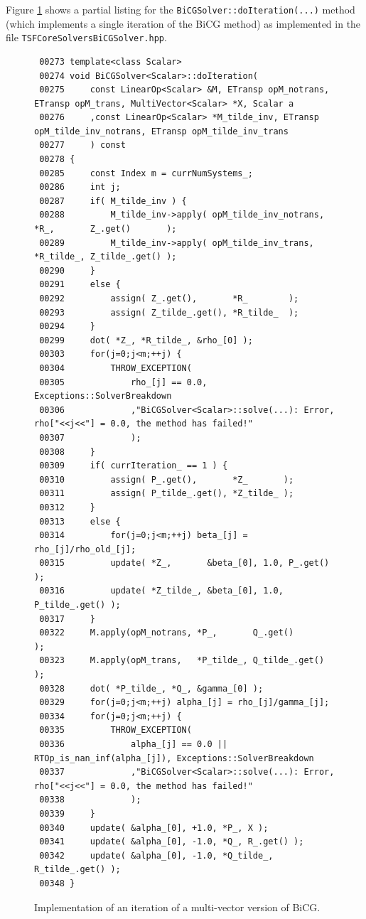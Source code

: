 Figure \ref{tsfcore:fig:BiCG_code} shows a partial listing for the
\texttt{BiCGSolver\-::doIteration(...)} method (which implements
a single iteration of the BiCG method) as implemented in the file
\texttt{TSFCore\-Solvers\-BiCG\-Solver.hpp}.
%
{\bsinglespace
\begin{figure}
\begin{minipage}{\textwidth}
{\scriptsize\begin{verbatim}
 00273 template<class Scalar>
 00274 void BiCGSolver<Scalar>::doIteration(
 00275     const LinearOp<Scalar> &M, ETransp opM_notrans, ETransp opM_trans, MultiVector<Scalar> *X, Scalar a
 00276     ,const LinearOp<Scalar> *M_tilde_inv, ETransp opM_tilde_inv_notrans, ETransp opM_tilde_inv_trans
 00277     ) const
 00278 {
 00285     const Index m = currNumSystems_;
 00286     int j;
 00287     if( M_tilde_inv ) {
 00288         M_tilde_inv->apply( opM_tilde_inv_notrans, *R_,       Z_.get()       );
 00289         M_tilde_inv->apply( opM_tilde_inv_trans,   *R_tilde_, Z_tilde_.get() );
 00290     }
 00291     else {
 00292         assign( Z_.get(),       *R_        );
 00293         assign( Z_tilde_.get(), *R_tilde_  );
 00294     }
 00299     dot( *Z_, *R_tilde_, &rho_[0] );
 00303     for(j=0;j<m;++j) {
 00304         THROW_EXCEPTION(
 00305             rho_[j] == 0.0, Exceptions::SolverBreakdown
 00306             ,"BiCGSolver<Scalar>::solve(...): Error, rho["<<j<<"] = 0.0, the method has failed!"
 00307             );
 00308     }
 00309     if( currIteration_ == 1 ) {
 00310         assign( P_.get(),       *Z_       );
 00311         assign( P_tilde_.get(), *Z_tilde_ );
 00312     }
 00313     else {
 00314         for(j=0;j<m;++j) beta_[j] = rho_[j]/rho_old_[j];
 00315         update( *Z_,       &beta_[0], 1.0, P_.get()       );
 00316         update( *Z_tilde_, &beta_[0], 1.0, P_tilde_.get() );
 00317     }
 00322     M.apply(opM_notrans, *P_,       Q_.get()       );
 00323     M.apply(opM_trans,   *P_tilde_, Q_tilde_.get() );
 00328     dot( *P_tilde_, *Q_, &gamma_[0] );
 00329     for(j=0;j<m;++j) alpha_[j] = rho_[j]/gamma_[j];
 00334     for(j=0;j<m;++j) {
 00335         THROW_EXCEPTION(
 00336             alpha_[j] == 0.0 || RTOp_is_nan_inf(alpha_[j]), Exceptions::SolverBreakdown
 00337             ,"BiCGSolver<Scalar>::solve(...): Error, rho["<<j<<"] = 0.0, the method has failed!"
 00338             );
 00339     }
 00340     update( &alpha_[0], +1.0, *P_, X );
 00341     update( &alpha_[0], -1.0, *Q_, R_.get() );
 00342     update( &alpha_[0], -1.0, *Q_tilde_, R_tilde_.get() );
 00348 }
\end{verbatim}}
\end{minipage}
\caption{
\label{tsfcore:fig:BiCG_code}
Implementation of an iteration of a multi-vector version of BiCG.
}
\end{figure}
\esinglespace}
